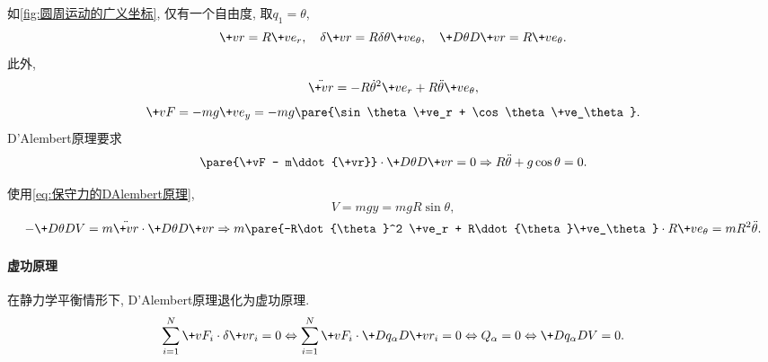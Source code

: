 \documentclass[../LectureNotes.tex]{subfiles}
\begin{document}
\begin{sample}
    \begin{ex}
        如\cref{fig:圆周运动的广义坐标}, 仅有一个自由度, 取$q_1 = \theta$,
        \[ \+vr = R\+ve_r,\quad \delta\+vr = R\delta\theta \+ve_\theta,\quad \+D\theta D{\+vr} = R\+ve_\theta. \]
        此外,
        \[ \ddot{\+vr} = -R\dot{\theta}^2\+ve_r + R\ddot{\theta}\+ve_\theta, \]
        \[ \+vF = -mg\+ve_y = -mg\pare{\sin\theta \+ve_r + \cos\theta \+ve_\theta}. \]
        D'Alembert原理要求
        \[ \pare{\+vF - m\ddot{\+vr}}\cdot\+D\theta D{\+vr} = 0 \Rightarrow R\ddot{\theta} + g\cos\theta = 0. \]
    \end{ex}
    \begin{ex}
        使用\eqref{eq:保守力的DAlembert原理},
        \[ V = mgy = mgR\sin\theta, \]
        \[ -\+D{\theta}D{V} = m\ddot{\+vr}\cdot\+D{\theta}D{\+vr} \Rightarrow m\pare{-R\dot{\theta}^2 \+ve_r + R\ddot{\theta}\+ve_\theta}\cdot R\+ve_\theta = mR^2\ddot{\theta}. \]
    \end{ex}
\end{sample}


\paragraph{虚功原理} %
\label{par:虚功原理}

在静力学平衡情形下, D'Alembert原理退化为虚功原理.
\[ \sum_{i=1}^N \+vF_i \cdot\delta\+vr_i = 0 \Leftrightarrow \sum_{i=1}^N \+vF_i \cdot \+D{q_\alpha}D{\+vr_i} = 0 \Leftrightarrow Q_\alpha = 0 \Leftrightarrow \+D{q_\alpha}DV = 0. \]

\end{document}
